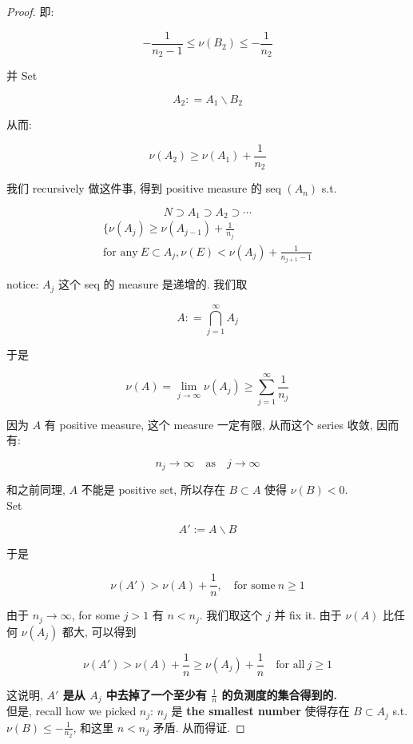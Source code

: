 \documentclass{qlnotes-export}
\begin{document}
\begin{proof}
即:

\[- \frac{1}{n_{2} - 1} \leq \nu(B_{2}) \leq - \frac{1}{n_{2}}\]

并 Set

\[A_{2}: = A_{1}\backslash B_{2}\]

从而:

\[\nu(A_{2}) \geq \nu(A_{1}) + \frac{1}{n_{2}}\]

我们 recursively 做这件事, 得到 positive measure 的 seq \((A_{n})\) s.t.

\[N \supset A_{1} \supset A_{2} \supset \cdots\]\[\begin{matrix}
{\{\nu(A_{j}) \geq \nu(A_{j - 1}) + \frac{1}{n_{j}}} \\
{\text{for any}\ E \subset A_{j},\nu(E) < \nu(A_{j}) + \frac{1}{n_{j + 1} - 1}}
\end{matrix}\]

notice: \(A_{j}\) 这个 seq 的 measure 是递增的. 我们取

\[A: = \bigcap\limits_{j = 1}^{\infty}A_{j}\]

于是

\[\nu(A) = \lim\limits_{j\rightarrow\infty}\nu(A_{j}) \geq \sum\limits_{j = 1}^{\infty}\frac{1}{n_{j}}\]

因为 \(A\) 有 positive measure, 这个 measure 一定有限, 从而这个 series 收敛, 因而有:

\[n_{j}\rightarrow\infty\quad\text{as}\quad j\rightarrow\infty\]

和之前同理, \(A\) 不能是 positive set, 所以存在 \(B \subset A\) 使得 \(\nu(B) < 0\).\\
Set

\[A' := A\backslash B\]

于是

\[\nu(A') > \nu(A) + \frac{1}{n},\quad\text{for some}\ n \geq 1\]

由于 \(n_{j}\rightarrow\infty\), for some \(j > 1\) 有 \(n < n_{j}\). 我们取这个 \(j\) 并 fix it. 由于 \(\nu(A)\) 比任何 \(\nu(A_{j})\) 都大, 可以得到

\[\nu(A') > \nu(A) + \frac{1}{n} \geq \nu(A_{j}) + \frac{1}{n}\quad\text{for all}\ j \geq 1\]

这说明, \textbf{\(A'\) 是从 \(A_{j}\) 中去掉了一个至少有 \(\frac{1}{n}\) 的负测度的集合得到的.}\\
但是, recall how we picked \(n_{j}\): \(n_{j}\) 是 \textbf{the smallest number} 使得存在 \(B \subset A_{j}\) s.t. \(\nu(B) \leq - \frac{1}{n_{2}}\), 和这里 \(n < n_{j}\) 矛盾. 从而得证.

\end{proof}
\end{document}
